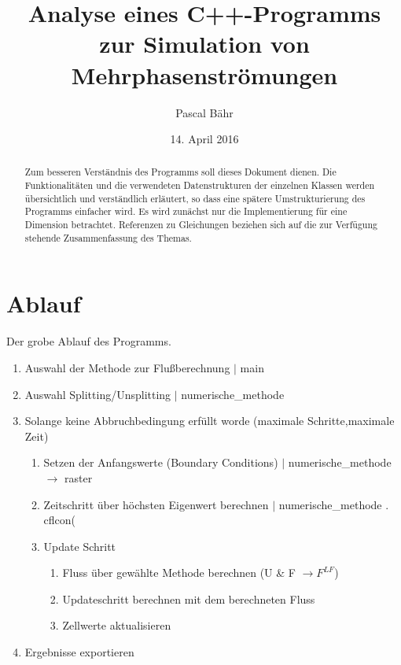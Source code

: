 \documentclass[12pt]{article}
\title{\vspace*{-10mm}Analyse eines C++-Programms\\ zur Simulation von Mehrphasenströmungen}
\author{
	Pascal Bähr
	}
\date{14. April 2016}
\begin{document}
\maketitle

\begin{abstract}
Zum besseren Verständnis des Programms soll dieses Dokument dienen. Die Funktionalitäten und die verwendeten Datenstrukturen der einzelnen Klassen werden übersichtlich und verständlich erläutert, so dass eine spätere Umstrukturierung des Programms einfacher wird. Es wird zunächst nur die Implementierung für eine Dimension betrachtet. Referenzen zu Gleichungen beziehen sich auf die zur Verfügung stehende Zusammenfassung des Themas.
\end{abstract}



\section{Ablauf}
Der grobe Ablauf des Programms.
\begin{enumerate}
	\item Auswahl der Methode zur Flußberechnung $|$ main
	\item Auswahl Splitting/Unsplitting $|$ numerische\_methode
	\item Solange keine Abbruchbedingung erfüllt worde (maximale Schritte,maximale Zeit)
	\begin{enumerate}
		\item Setzen der Anfangswerte (Boundary Conditions) $|$ numerische\_methode $\rightarrow$ raster
		\item Zeitschritt über höchsten Eigenwert berechnen $|$ numerische\_methode . cflcon(
		\item Update Schritt
		\begin{enumerate}
			\item Fluss über gewählte Methode berechnen (U \& F $\rightarrow F^{LF}$)
			\item Updateschritt berechnen mit dem berechneten Fluss
			\item Zellwerte aktualisieren
		\end{enumerate}	
	\end{enumerate}	
	\item Ergebnisse exportieren
\end{enumerate}	
\end{document}
